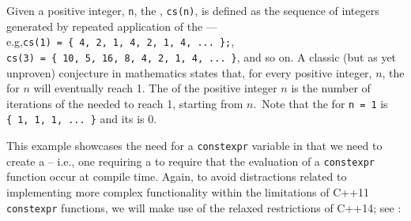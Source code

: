     
\noindent Given a positive integer, \lstinline!n!, the ,
\lstinline!cs(n)!, is defined as the sequence of integers generated by
repeated application of the  --- e.g,\linebreak[4]%
 \lstinline!cs(1)!~\lstinline!=!~\lstinline!{!~\lstinline!4,!~\lstinline!2,!~\lstinline!1,!~\lstinline!4,!~\lstinline!2,!~\lstinline!1,!~\lstinline!4,!~\lstinline!...!~\lstinline!};!,
\lstinline!cs(3)!~\lstinline!=!~\lstinline!{!~\lstinline!10,!~\lstinline!5,!~\lstinline!16,!~\lstinline!8,!~\lstinline!4,!~\lstinline!2,!~\lstinline!1,!~\lstinline!4,!~\lstinline!...!~\lstinline!}!,
and so on. A classic (but as yet unproven) conjecture in mathematics
states that, for every positive integer, $n$, the  for $n$ will eventually reach 1. The  of
the positive integer $n$ is the number of iterations of the
 needed to reach 1, starting from $n$.~Note that
the  for \lstinline!n!~\lstinline!=!~\lstinline!1! is
\lstinline!{!~\lstinline!1,!~\lstinline!1,!~\lstinline!1,!~\lstinline!...!~\lstinline!}!
and its  is 0.

This example showcases the need for a \lstinline!constexpr! variable in
that we need to create a  -- i.e., one
requiring a  to require that the
evaluation of a \lstinline!constexpr! function occur at compile time.
Again, to avoid distractions related to implementing more complex
functionality within the limitations of C++11 \lstinline!constexpr!
functions, we will make use of the relaxed restrictions of C++14; see
:

